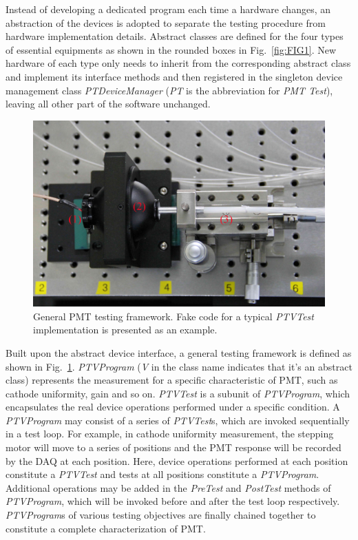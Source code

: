 \documentclass{nst}
\begin{document}
Instead of developing a dedicated program each time a hardware changes, an abstraction of the devices is adopted to separate the testing procedure from hardware implementation details. 
Abstract classes are defined for the four types of essential equipments as shown in the rounded boxes in Fig.~\ref{fig:FIG1}.
New hardware of each type only needs to inherit from the corresponding abstract class and implement its interface methods and then registered in the singleton device management class \textit{PTDeviceManager} (\textit{PT} is the abbreviation for \textit{PMT Test}), leaving all other part of the software unchanged.

\begin{figure}[!htb]
	\centering
	\includegraphics[width=120mm]{FIG4}
	\caption{General PMT testing framework. Fake code for a typical \textit{PTVTest} implementation is presented as an example.}
	\label{fig:FIG4}
\end{figure}

Built upon the abstract device interface, a general testing framework is defined as shown in Fig.~\ref{fig:FIG4}.
\textit{PTVProgram} (\textit{V} in the class name indicates that it's an abstract class) represents the measurement for a specific characteristic of PMT, such as cathode uniformity, gain and so on.
\textit{PTVTest} is a subunit of \textit{PTVProgram}, which encapsulates the real device operations performed under a specific condition.
A \textit{PTVProgram} may consist of a series of \textit{PTVTest}s, which are invoked sequentially in a test loop.
For example, in cathode uniformity measurement, the stepping motor will move to a series of positions and the PMT response will be recorded by the DAQ at each position.
Here, device operations performed at each position constitute a \textit{PTVTest} and tests at all positions constitute a \textit{PTVProgram}.
Additional operations may be added in the \textit{PreTest} and \textit{PostTest} methods of \textit{PTVProgram}, which will be invoked before and after the test loop respectively.
\textit{PTVProgram}s of various testing objectives are finally chained together to constitute a complete characterization of PMT.
\end{document}
